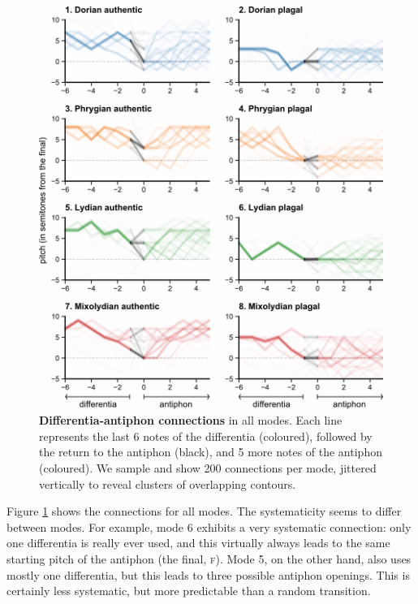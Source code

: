 \documentclass[sigconf,screen]{acmart}
\begin{document}
\begin{figure}[t]
  \centering
  \includegraphics[width=\linewidth]{figures/fig05-connections.png}
  \caption{\normalfont%
    \textbf{Differentia-antiphon connections} in all modes.
    Each line represents the last 6 notes of the differentia (coloured), followed by the return to the antiphon (black), and 5 more notes of the antiphon (coloured).
    We sample and show 200 connections per mode, jittered vertically to reveal clusters of overlapping contours.
    }%
    \label{fig:connections}
\end{figure}


Figure \ref{fig:connections} shows the connections for all modes.
The systematicity seems to differ between modes.
For example, mode 6 exhibits a very systematic connection: only one differentia is really ever used, and this virtually always leads to the same starting pitch of the antiphon (the final, \textsc{f}).
Mode 5, on the other hand, also uses mostly one differentia, but this leads to three possible antiphon openings.
This is certainly less systematic, but more predictable than a random transition.
\end{document}
